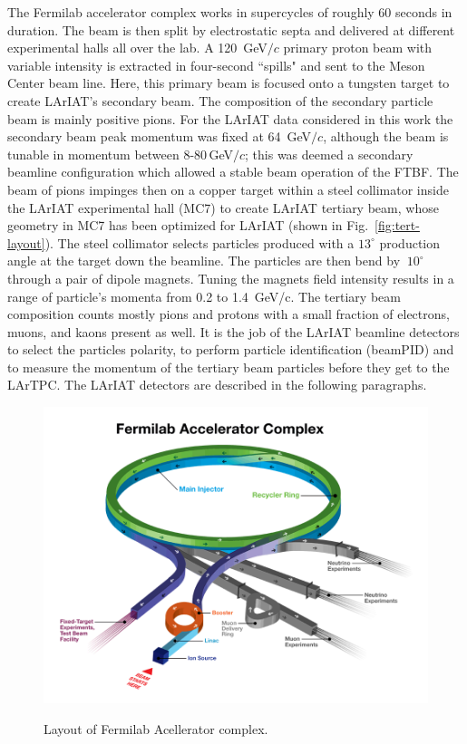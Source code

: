 The Fermilab accelerator complex works in supercycles of roughly 60 seconds in duration. The beam is then split by electrostatic septa and delivered at different experimental halls all over the lab. A 120~GeV$/c$ primary proton beam with variable intensity is extracted in four-second ``spills" and sent to the Meson Center beam line. Here, this primary beam is focused onto a tungsten target to create LArIAT's secondary beam. The composition of the secondary particle beam is mainly positive pions. For the LArIAT data considered in this work the secondary beam peak momentum was fixed at 64~GeV$/c$, although the beam is tunable in momentum between 8-80\,GeV$/c$; this was deemed a secondary beamline configuration which allowed a stable beam operation of the FTBF.
The beam of pions impinges then on a copper target within a steel collimator inside the LArIAT experimental hall (MC7) to create LArIAT tertiary beam, whose geometry in MC7 has been optimized for LArIAT (shown in  Fig.~\ref{fig:tert-layout}).   The steel collimator selects particles produced with a $13^\circ$ production angle at the target down the beamline.  The particles are then bend by  $~10^\circ$  through a pair of dipole magnets.  Tuning the magnets field intensity results in a range of particle's momenta from 0.2 to 1.4~GeV/c.
The tertiary beam composition counts mostly pions and protons with a small fraction of electrons, muons, and kaons present as well. It is the job of the LArIAT beamline detectors to select the particles polarity,  to perform particle identification (beamPID) and to measure the momentum of the tertiary beam particles before they get to the LArTPC. The LArIAT detectors are described in the following paragraphs.  

\begin{figure}
  \centering  	
\includegraphics[width=\textwidth,height=\textheight,keepaspectratio]{Chapter-3/Images/AcceleratorFNAL.png}
\label{fig:Accelerator}
\caption{Layout of Fermilab Acellerator complex.}
\end{figure}

